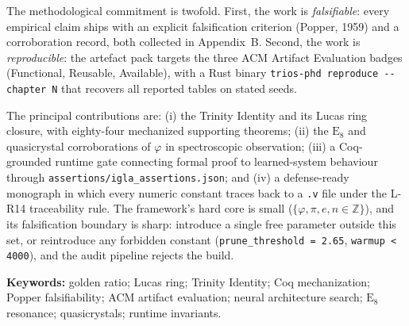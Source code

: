 The methodological commitment is twofold. First, the work is
\emph{falsifiable}: every empirical claim ships with an explicit
falsification criterion (Popper, 1959) and a corroboration record, both
collected in Appendix~B. Second, the work is \emph{reproducible}: the
artefact pack targets the three ACM Artifact Evaluation badges
(Functional, Reusable, Available), with a Rust binary
\verb|trios-phd reproduce --chapter N| that recovers all reported tables
on stated seeds.

The principal contributions are: (i) the Trinity Identity and its Lucas
ring closure, with eighty-four mechanized supporting theorems; (ii) the
\(\mathrm{E}_{8}\) and quasicrystal corroborations of \(\varphi\) in
spectroscopic observation; (iii) a Coq-grounded runtime gate connecting
formal proof to learned-system behaviour through
\verb|assertions/igla_assertions.json|; and (iv) a defense-ready
monograph in which every numeric constant traces back to a \verb|.v| file
under the L-R14 traceability rule. The framework's hard core is small
(\(\{\varphi, \pi, e, n \in \mathbb{Z}\}\)), and its falsification
boundary is sharp: introduce a single free parameter outside this set,
or reintroduce any forbidden constant
(\verb|prune_threshold = 2.65|, \verb|warmup < 4000|), and the audit
pipeline rejects the build.

\bigskip
\noindent\textbf{Keywords:} golden ratio; Lucas ring; Trinity Identity;
Coq mechanization; Popper falsifiability; ACM artifact evaluation;
neural architecture search; \(\mathrm{E}_{8}\) resonance; quasicrystals;
runtime invariants.
